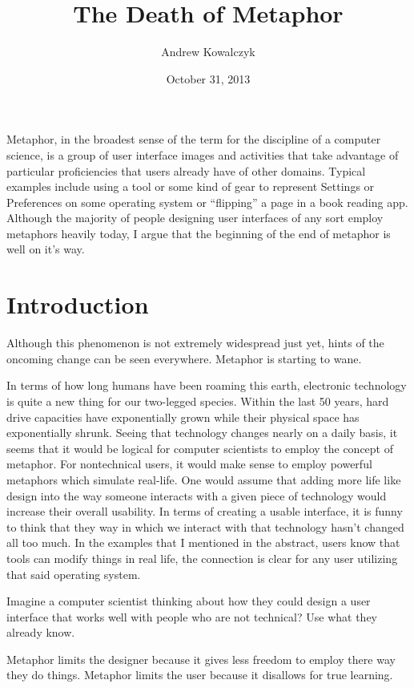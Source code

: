 \documentclass[11pt, oneside]{article}   	%
\title{The Death of Metaphor}
\author{Andrew Kowalczyk}
\date{October 31, 2013}							%
\begin{document}
\maketitle

Metaphor, in the broadest sense of the term for the discipline of a computer science, is a group of user interface images and activities that take advantage of particular proficiencies that users already have of other domains. Typical examples include using a tool or some kind of gear to represent Settings or Preferences on some operating system or ``flipping'' a page in a book reading app.  Although the majority of people designing user interfaces of any sort employ metaphors heavily today, I argue that the beginning of the end of metaphor is well on it's way.  

\section{Introduction}

Although this phenomenon is not extremely widespread just yet, hints of the oncoming change can be seen everywhere. Metaphor is starting to wane.

In terms of how long humans have been roaming this earth, electronic technology is quite a new thing for our two-legged species. Within the last 50 years, hard drive capacities have exponentially grown while their physical space has exponentially shrunk. Seeing that technology changes nearly on a daily basis, it seems that it would be logical for computer scientists to employ the concept of metaphor. For nontechnical users, it would make sense to employ powerful metaphors which simulate real-life. One would assume that adding more life like design into the way someone interacts with a given piece of technology would increase their overall usability. In terms of creating a usable interface, it is funny to think that they way in which we interact with that technology hasn't changed all too much. In the examples that I mentioned in the abstract, users know that tools can modify things in real life, the connection is clear for any user utilizing that said operating system.

Imagine a computer scientist thinking about how they could design a user interface that works well with people who are not technical? Use what they already know. 

Metaphor limits the designer because it gives less freedom to employ there way they do things. Metaphor limits the user because it disallows for true learning.
\end{document}

